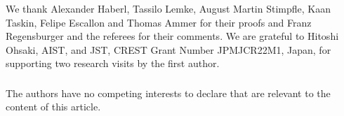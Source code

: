 \documentclass[runningheads]{llncs}
\begin{document}
\begin{credits}
\subsubsection{\ackname}
We thank Alexander Haberl, Tassilo Lemke, August Martin Stimpfle, Kaan Taskin, Felipe Escallon
and Thomas Ammer for their proofs and Franz Regensburger and the referees for their comments.
We are grateful to Hitoshi Ohsaki, AIST, and JST, CREST Grant Number JPMJCR22M1, Japan,
for supporting two research visits by the first author.
\subsubsection{\discintname}
The authors have no competing interests to declare that are relevant to the content of this article.
\end{credits}



\end{document}
